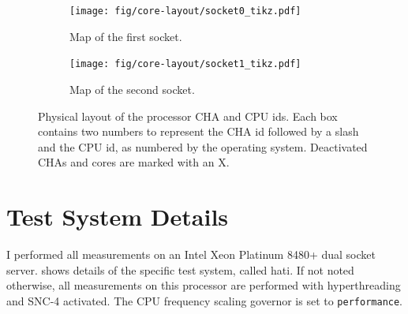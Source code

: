 \begin{figure}[]
    \begin{subfigure}[t]{0.45\linewidth}
        \centering
        \texttt{[image: fig/core-layout/socket0\_tikz.pdf]}
        \caption{Map of the first socket.}
    \end{subfigure}
    \hfill
    \begin{subfigure}[t]{0.45\linewidth}
        \centering
        \texttt{[image: fig/core-layout/socket1\_tikz.pdf]}
        \caption{Map of the second socket.}
    \end{subfigure}
    \caption{\label{fig:physical-layout}Physical layout of the processor CHA and CPU ids.
	Each box contains two numbers to represent the CHA id followed by a slash and the CPU id, as numbered by the operating system.
	Deactivated CHAs and cores are marked with an X.}
\end{figure}

\section{Test System Details}
I performed all measurements on an Intel Xeon Platinum 8480+ dual socket server.
 shows details of the specific test system, called hati.
If not noted otherwise, all measurements on this processor are performed with hyperthreading and \ac{SNC}-4 activated.
The CPU frequency scaling governor is set to \texttt{performance}.


